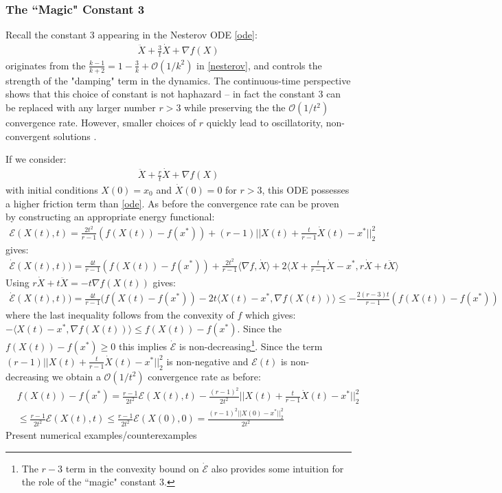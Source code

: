 \subsubsection{The ``Magic" Constant 3}
Recall the constant $3$ appearing in the Nesterov ODE \eqref{ode}:
\begin{align}
    \ddot{X} + \frac{3}{t} \dot{X} + \nabla f(X) 
\end{align}
originates from the $\frac{k-1}{k+2} = 1 - \frac{3}{k} + \mathcal{O}(1/k^2)$ in \eqref{nesterov}, and controls the strength of the "damping" term in the dynamics. The continuous-time perspective shows that this choice of constant is not haphazard -- in fact the constant $3$ can be replaced with any larger number $r>3$ while preserving the the $\mathcal{O}(1/t^2)$ convergence rate. However, smaller choices of $r$ quickly lead to oscillatority, non-convergent solutions \cite{su2014differential}.

If we consider:
\begin{align}
    \ddot{X} + \frac{r}{t} \dot{X} + \nabla f(X) \label{highfrictionode}
\end{align}
with initial conditions $X(0) = x_0$ and $\dot{X}(0) = 0$ for $r>3$, this ODE possesses a higher friction term than \eqref{ode}. As before the convergence rate can be proven by constructing an appropriate energy functional:
\begin{align*}
    \mathcal{E}(X(t), t) = \frac{2t^2}{r-1} \left( f(X(t)) -f(x^*) \right) + (r-1) ||X(t) + \frac{t}{r-1}\dot{X}(t) -x^*||_2^2
\end{align*}
gives:
\begin{align*}
    \dot{\mathcal{E}}(X(t), t)) = \frac{4t}{r-1}(f(X(t)) - f(x^*)) + \frac{2t^2}{r-1} \langle \nabla f, \dot{X} \rangle + 2 \langle X + \frac{t}{r-1} \dot{X} - x^*, r \dot{X} + t \ddot{X} \rangle
\end{align*}
Using $r\dot{X} + t \ddot{X} = -t \nabla f(X(t))$ gives:
\begin{align*}
    \dot{\mathcal{E}}(X(t), t)) = \frac{4t}{r-1} (f(X(t) - f(x^*)) - 2t \langle X(t) - x^*, \nabla f(X(t)) \rangle \leq - \frac{2(r-3)t}{r-1}(f(X(t))-f(x^*))
\end{align*}
where the last inequality follows from the convexity of $f$ which gives: $-\langle X(t) - x^*, \nabla f(X(t)) \rangle \leq f(X(t)) - f(x^*)$. Since the $f(X(t)) - f(x^*) \geq 0$ this implies $\dot{\mathcal{E}}$ is non-decreasing\footnote{The $r-3$ term in the convexity bound on $\dot{\mathcal{E}}$ also provides some intuition for the role of the ``magic" constant $3$.}. Since the term $(r-1) ||X(t) + \frac{t}{r-1} \dot{X}(t) - x^*||_2^2$ is non-negative and $\mathcal{E}(t)$ is non-decreasing we obtain a $\mathcal{O}(1/t^2)$ convergence rate as before:
\begin{align*}
    & f(X(t)) - f(x^*) = \frac{r-1}{2t^2} \mathcal{E}(X(t), t) - \frac{(r-1)^2}{2t^2} ||X(t) + \frac{t}{r-1} \dot{X}(t) - x^*||_2^2 \\
    & \leq \frac{r-1}{2t^2} \mathcal{E}(X(t), t) \leq \frac{r-1}{2t^2} \mathcal{E}(X(0), 0) = \frac{(r-1)^2 ||X(0)-x^*||_2^2}{2 t^2}
\end{align*}
Present numerical examples/counterexamples
 
